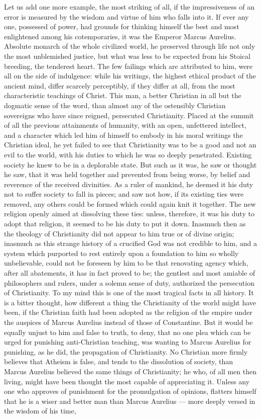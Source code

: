 \documentclass[12pt]{report}
\begin{document}
Let us add one more example, the most striking of all, if the impressiveness of an error is measured by the wisdom and virtue of him who falls into it. If ever any one, possessed of power, had grounds for thinking himself the best and most enlightened among his cotemporaries, it was the Emperor Marcus Aurelius. Absolute monarch of the whole civilized world, he preserved through life not only the most unblemished justice, but what was less to be expected from his Stoical breeding, the tenderest heart. The few failings which are attributed to him, were all on the side of indulgence: while his writings, the highest ethical product of the ancient mind, differ scarcely perceptibly, if they differ at all, from the most characteristic teachings of Christ. This man, a better Christian in all but the dogmatic sense of the word, than almost any of the ostensibly Christian sovereigns who have since reigned, persecuted Christianity. Placed at the summit of all the previous attainments of humanity, with an open, unfettered intellect, and a character which led him of himself to embody in his moral writings the Christian ideal, he yet failed to see that Christianity was to be a good and not an evil to the world, with his duties to which he was so deeply penetrated. Existing society he knew to be in a deplorable state. But such as it was, he saw or thought he saw, that it was held together and prevented from being worse, by belief and reverence of the received divinities. As a ruler of mankind, he deemed it his duty not to suffer society to fall in pieces; and saw not how, if its existing ties were removed, any others could be formed which could again knit it together. The new religion openly aimed at dissolving these ties: unless, therefore, it was his duty to adopt that religion, it seemed to be his duty to put it down. Inasmuch then as the theology of Christianity did not appear to him true or of divine origin; inasmuch as this strange history of a crucified God was not credible to him, and a system which purported to rest entirely upon a foundation to him so wholly unbelievable, could not be foreseen by him to be that renovating agency which, after all abatements, it has in fact proved to be; the gentlest and most amiable of philosophers and rulers, under a solemn sense of duty, authorized the persecution of Christianity. To my mind this is one of the most tragical facts in all history. It is a bitter thought, how different a thing the Christianity of the world might have been, if the Christian faith had been adopted as the religion of the empire under the auspices of Marcus Aurelius instead of those of Constantine. But it would be equally unjust to him and false to truth, to deny, that no one plea which can be urged for punishing anti-Christian teaching, was wanting to Marcus Aurelius for punishing, as he did, the propagation of Christianity. No Christian more firmly believes that Atheism is false, and tends to the dissolution of society, than Marcus Aurelius believed the same things of Christianity; he who, of all men then living, might have been thought the most capable of appreciating it. Unless any one who approves of punishment for the promulgation of opinions, flatters himself that he is a wiser and better man than Marcus Aurelius — more deeply versed in the wisdom of his time, 
\end{document}
